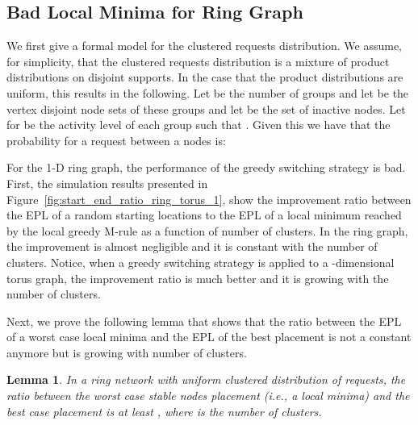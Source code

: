 \documentclass[conference]{IEEEtran}
\newtheorem{lemma}{Lemma}
\begin{document}
\subsection{Bad Local Minima for Ring Graph}\label{app_ring_bad}
We first give a formal model for the clustered requests distribution.
We assume, for simplicity, that the clustered requests distribution is a mixture of product distributions on disjoint supports. In the case that the product distributions are uniform, this results in the following.
Let  be the number of groups and let  be the vertex disjoint node sets of these groups and let  be the set of inactive nodes. Let  for  be the activity level of each group such that . Given this we have that the probability  for a request between a nodes  is:



For the 1-D ring graph, the performance of the greedy switching strategy is bad. 
First, the simulation results presented in Figure~\ref{fig:start_end_ratio_ring_torus_1}, show the improvement ratio between the EPL of a random starting locations to the EPL of a local minimum reached by the local greedy M-rule as a function of number of clusters. In the ring graph, the improvement is almost negligible and it is constant with the number of clusters. 
Notice, when a greedy switching strategy is applied to a -dimensional torus graph, the improvement ratio is much better and it is growing with the number of clusters. 


Next, we prove the following lemma that shows that the ratio between the EPL of a worst case local minima and the EPL of the best placement is not a constant anymore but is growing with number of clusters.

\begin{lemma}\label{lemma:bad_local_ring}
In a ring network with uniform clustered distribution of requests, 
the ratio between the worst case stable nodes placement (i.e., a local minima) and the best case placement is at least , where  is the number of clusters.
\end{lemma}
\end{document}
